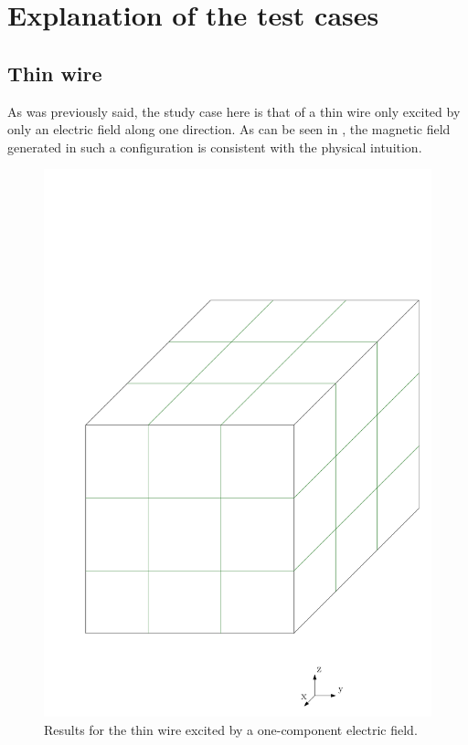 \documentclass[12 pt]{article}
\begin{document}
\section{Explanation of the test cases}
\subsection{Thin wire}
As was previously said, the study case here is that of a thin wire only excited by only an electric field along one direction. As can be seen in , the magnetic field generated in such a configuration is consistent with the physical intuition.
%
\begin{figure}
	\centering
	\includegraphics[scale=0.5]{MPI_cubic_division}
	\caption{Results for the thin wire excited by a one-component electric field.}
	\label{fig:THINWIRE}
\end{figure}
%
\end{document}
